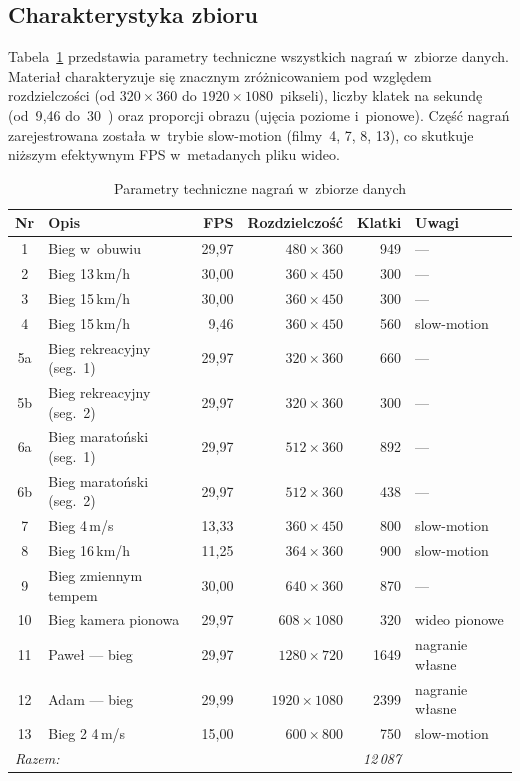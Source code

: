 \subsection{Charakterystyka zbioru}
\label{sec:dataset-charakterystyka}

Tabela~\ref{tab:dataset} przedstawia parametry techniczne wszystkich nagrań w~zbiorze danych. Materiał charakteryzuje się znacznym zróżnicowaniem pod względem rozdzielczości (od $320 \times 360$ do $1920 \times 1080$~pikseli), liczby klatek na sekundę (od~9{,}46 do~30~) oraz proporcji obrazu (ujęcia poziome i~pionowe). Część nagrań zarejestrowana została w~trybie slow-motion (filmy~4, 7, 8, 13), co skutkuje niższym efektywnym FPS w~metadanych pliku wideo.

\begin{table}[htbp]
\centering
\caption{Parametry techniczne nagrań w~zbiorze danych}
\label{tab:dataset}
\small
\begin{tabular}{clrrrl}
\hline
\textbf{Nr} & \textbf{Opis} & \textbf{FPS} & \textbf{Rozdzielczość} & \textbf{Klatki} & \textbf{Uwagi} \\
\hline
1  & Bieg w~obuwiu              & 29{,}97 & $480 \times 360$   & 949  & --- \\
2  & Bieg 13\,km/h              & 30{,}00 & $360 \times 450$   & 300  & --- \\
3  & Bieg 15\,km/h              & 30{,}00 & $360 \times 450$   & 300  & --- \\
4  & Bieg 15\,km/h              &  9{,}46 & $360 \times 450$   & 560  & slow-motion \\
5a & Bieg rekreacyjny (seg.\ 1) & 29{,}97 & $320 \times 360$   & 660  & --- \\
5b & Bieg rekreacyjny (seg.\ 2) & 29{,}97 & $320 \times 360$   & 300  & --- \\
6a & Bieg maratoński (seg.\ 1)  & 29{,}97 & $512 \times 360$   & 892  & --- \\
6b & Bieg maratoński (seg.\ 2)  & 29{,}97 & $512 \times 360$   & 438  & --- \\
7  & Bieg 4\,m/s                & 13{,}33 & $360 \times 450$   & 800  & slow-motion \\
8  & Bieg 16\,km/h         & 11{,}25 & $364 \times 360$   & 900  & slow-motion \\
9  & Bieg zmiennym tempem       & 30{,}00 & $640 \times 360$   & 870  & --- \\
10 & Bieg kamera pionowa       & 29{,}97 & $608 \times 1080$  & 320  & wideo pionowe \\
11 & Paweł --- bieg             & 29{,}97 & $1280 \times 720$  & 1649 & nagranie własne \\
12 & Adam --- bieg              & 29{,}99 & $1920 \times 1080$ & 2399 & nagranie własne \\
13 & Bieg 2 4\,m/s                 & 15{,}00 & $600 \times 800$   & 750  & slow-motion \\
\hline
\multicolumn{4}{l}{\textit{Razem:}} & \textit{12\,087} & \\
\hline
\end{tabular}
\end{table}

